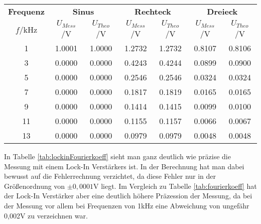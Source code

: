 \begin{center}
    \begin{tabular}{c | c c | c c | c c}
        \textbf{Frequenz} & \multicolumn{2}{c|}{\textbf{Sinus}} & \multicolumn{2}{c|}{\textbf{Rechteck}} & \multicolumn{2}{c}{\textbf{Dreieck}}\\
        $f$/kHz & $U_{Mess}$/V & $U_{Theo}$/V & $U_{Mess}$/V & $U_{Theo}$/V & $U_{Mess}$/V & $U_{Theo}$/V\\
        \hline
         1 &  1.0001 &  1.0000 & 1.2732 & 1.2732 & 0.8107 & 0.8106 \\
         3 &  0.0000 &  0.0000 & 0.4243 & 0.4244 & 0.0899 & 0.0900 \\
         5 &  0.0000 &  0.0000 & 0.2546 & 0.2546 & 0.0324 & 0.0324 \\
         7 &  0.0000 &  0.0000 & 0.1817 & 0.1819 & 0.0165 & 0.0165 \\
         9 &  0.0000 &  0.0000 & 0.1414 & 0.1415 & 0.0099 & 0.0100 \\
        11 &  0.0000 &  0.0000 & 0.1155 & 0.1157 & 0.0066 & 0.0067 \\
        13 &  0.0000 &  0.0000 & 0.0979 & 0.0979 & 0.0048 & 0.0048 \\
    \end{tabular}
    \label{tab:lockinFourierkoeff}
\end{center} 
In Tabelle \ref{tab:lockinFourierkoeff} sieht man ganz deutlich wie präzise die Messung mit einem Lock-In Verstärkers ist. In der Berechnung hat man dabei bewusst auf die Fehlerrechnung verzichtet, da diese Fehler nur in der Größenordnung von $\pm 0,0001$V liegt. Im Vergleich zu Tabelle \ref{tab:fourierkoeff} hat der Lock-In Verstärker aber eine deutlich höhere Präzession der Messung, da bei der Messung vor allem bei Frequenzen von 1kHz eine Abweichung von ungefähr 0,002V zu verzeichnen war.
\newpage
